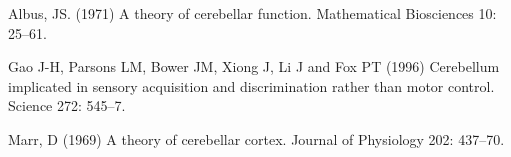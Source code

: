 \documentclass[12pt]{article}
\begin{document}
\begin{thebibliography}{10}

Albus, JS. (1971) A theory of cerebellar function. 
\newblock Mathematical Biosciences 10: 25--61.


Gao J-H, Parsons LM, Bower JM, Xiong J, Li J and Fox PT (1996) Cerebellum implicated in sensory acquisition and discrimination rather than motor control.
\newblock Science 272: 545--7. 

Marr, D (1969) A theory of cerebellar cortex.
\newblock Journal of Physiology 202: 437--70.


\end{thebibliography}
\end{document}
